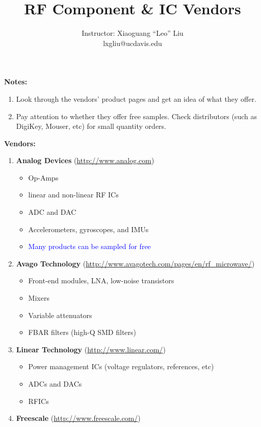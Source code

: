\documentclass[letterpaper, 11pt]{article}
\title{RF Component \& IC Vendors}
\author{Instructor: Xiaoguang ``Leo'' Liu\\lxgliu@ucdavis.edu}
\date{}
\begin{document}
\maketitle
\textbf{\Large Notes:}
\begin{enumerate}
	\item Look through the vendors' product pages and get an idea of what they offer. 
	
	\item Pay attention to whether they offer free samples. Check distributors (such as DigiKey, Mouser, etc) for small quantity orders.
\end{enumerate}

\textbf{\Large Vendors:}

\begin{enumerate}

	\item \textbf{Analog Devices} (\url{http://www.analog.com})
		\begin{itemize}
			\item Op-Amps
			\item linear and non-linear RF ICs
			\item ADC and DAC
			\item Accelerometers, gyroscopes, and IMUs
			\item \textcolor{blue}{Many products can be sampled for free}
		\end{itemize}
	\item \textbf{Avago Technology} (\url{http://www.avagotech.com/pages/en/rf_microwave/})
		\begin{itemize}
			\item Front-end modules, LNA, low-noise transistors
			\item Mixers
			\item Variable attenuators
			\item FBAR filters (high-Q SMD filters)
		\end{itemize}		
	\item \textbf{Linear Technology} (\url{http://www.linear.com/})
		\begin{itemize}
			\item Power management ICs (voltage regulators, references, etc)
			\item ADCs and DACs
			\item RFICs
		\end{itemize}	
	\item \textbf{Freescale} (\url{http://www.freescale.com/})
		\begin{itemize}

\end{itemize}
\end{enumerate}
\end{document}
